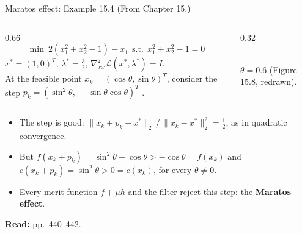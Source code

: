 \documentclass[aspectratio=169,12pt]{beamer}
\newcommand{\xs}{x^{*}}
\newcommand{\eqn}[1]{\text{\small(#1)}}
\newcommand{\readbook}[1]{{\color{red}\textbf{Read:} #1}}
\newcommand{\cL}{\mathcal{L}}
\newcommand{\hessL}{\nabla_{xx}^{2}\cL}
\newcommand{\from}[1]{{\small(From #1.)}}
\begin{document}
\begin{frame}{Maratos effect: Example 15.4 \from{Chapter 15}}
  \begin{columns}[T,totalwidth=\textwidth]
    \begin{column}{0.66\textwidth}
      \[ \min\ 2(x_{1}^{2}+x_{2}^{2}-1)-x_{1}\ \ \text{s.t.}\ \ x_{1}^{2}+x_{2}^{2}-1=0 \tag{15.34} \]
      $\xs=(1,0)^{T}$, $\lambda^{*}=\tfrac32$, $\hessL(\xs,\lambda^{*})=I$.\\[0.1em]
      At the feasible point $x_{k}=(\cos\theta,\sin\theta)^{T}$, consider the step
      $p_{k}=(\sin^{2}\theta,\,-\sin\theta\cos\theta)^{T}$ \eqn{15.35}.
    \end{column}
    \begin{column}{0.32\textwidth}
      \centering
      \\
      {\small $\theta=0.6$ (Figure 15.8, redrawn).}
    \end{column}
  \end{columns}
  \begin{itemize}\setlength\itemsep{0.3em}
    \item The step is good: $\|x_{k}+p_{k}-\xs\|_{2}\,/\,\|x_{k}-\xs\|_{2}^{2}=\tfrac12$, as in quadratic convergence.
    \item But $f(x_{k}+p_{k})=\sin^{2}\theta-\cos\theta>-\cos\theta=f(x_{k})$ and
      $c(x_{k}+p_{k})=\sin^{2}\theta>0=c(x_{k})$, for every $\theta\ne 0$.
    \item Every merit function $f+\mu h$ and the filter reject this step: the \textbf{Maratos effect}.
  \end{itemize}
  \readbook{pp.~440--442.}
\end{frame}
\end{document}
